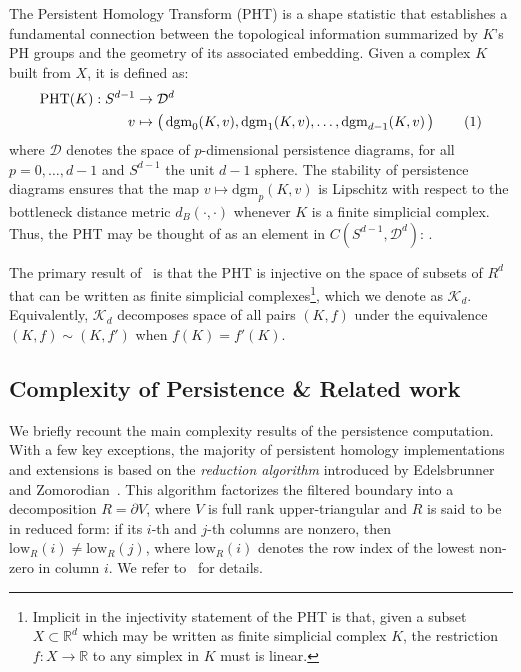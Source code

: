 \documentclass[10pt]{article}
\numberwithin{equation}{section}
\newcommand{\+}{%
	\raisebox{0.18ex}{\scaleobj{0.55}{+}}
}
\theoremstyle{definition}
\theoremstyle{definition}
\newcommand\numberthis{\addtocounter{equation}{1}\tag{\theequation}}
\begin{document}

The Persistent Homology Transform (PHT) is a shape statistic that establishes a fundamental connection between the topological information summarized by $K$'s PH groups and the geometry of its associated embedding. Given a complex $K$ built from $X$, it is defined as: 
\begin{align*}\label{eq:pht}
	\mathrm{PHT}(K): S^{d-1} &\to \mathcal{D}^d \\
	v &\mapsto \left( \, \mathrm{dgm}_0(K, v), \mathrm{dgm}_1(K, v), \dots, \mathrm{dgm}_{d-1}(K, v) \, \right)\numberthis
\end{align*}
where $\mathcal{D}$ denotes the space of $p$-dimensional persistence diagrams, for all $p = 0, \dots, d-1$ and $S^{d-1}$ the unit $d-1$ sphere. The stability of persistence diagrams ensures that the map $v \mapsto \mathrm{dgm}_p(K, v)$ is Lipschitz with respect to the bottleneck distance metric $d_B(\cdot, \cdot)$ whenever $K$ is a finite simplicial complex. 
Thus, the PHT may be thought of as an element in $C(S^{d-1}, \mathcal{D}^d)$: . 


The primary result of~\cite{} is that the PHT is injective on the space of subsets of $R^d$ that can be written as finite simplicial complexes\footnote{Implicit in the injectivity statement of the PHT is that, given a subset $X \subset \mathbb{R}^d$ which may be written as finite simplicial complex $K$, the restriction $f: X \to \mathbb{R}$ to any simplex in $K$ must is linear.}, which we denote as $\mathcal{K}_d$. 
Equivalently, $\mathcal{K}_d$ decomposes space of all pairs $(K, f)$ under the equivalence $(K, f) \sim (K,f')$ when $f(K) = f'(K)$.



\subsection{Complexity of Persistence \& Related work}
We briefly recount the main complexity results of the persistence computation. 
With a few key exceptions, the majority of persistent homology implementations and extensions is based on the \emph{reduction algorithm} introduced by Edelsbrunner and Zomorodian~\cite{edelsbrunner2000topological}. 
This algorithm factorizes the filtered boundary into a decomposition $R = \partial V$, where $V$ is full rank upper-triangular and $R$ is said to be in reduced form: if its $i$-th and $j$-th columns are nonzero, then $\mathrm{low}_R(i) \neq \mathrm{low}_R(j)$, where $\mathrm{low}_R(i)$ denotes the row index of the lowest non-zero in column $i$. 
We refer to~\cite{edelsbrunner2000topological, bauer2020persistence, dey2022computational} for details. 
\end{document}
